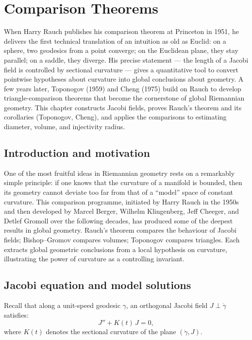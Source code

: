 \chapter{Comparison Theorems}
\label{ch:comparison}

When Harry Rauch publishes his comparison theorem at Princeton in 1951, he delivers the first technical translation of an intuition as old as Euclid: on a sphere, two geodesics from a point converge; on the Euclidean plane, they stay parallel; on a saddle, they diverge. His precise statement --- the length of a Jacobi field is controlled by sectional curvature --- gives a quantitative tool to convert pointwise hypotheses about curvature into global conclusions about geometry. A few years later, Toponogov (1959) and Cheng (1975) build on Rauch to develop triangle-comparison theorems that become the cornerstone of global Riemannian geometry. This chapter constructs Jacobi fields, proves Rauch's theorem and its corollaries (Toponogov, Cheng), and applies the comparisons to estimating diameter, volume, and injectivity radius.

\section{Introduction and motivation}

One of the most fruitful ideas in Riemannian geometry rests on a remarkably simple principle: if one knows that the curvature of a manifold is bounded, then its geometry cannot deviate too far from that of a ``model'' space of constant curvature. This comparison programme, initiated by Harry Rauch in the 1950s and then developed by Marcel Berger, Wilhelm Klingenberg, Jeff Cheeger, and Detlef Gromoll over the following decades, has produced some of the deepest results in global geometry. Rauch's theorem compares the behaviour of Jacobi fields; Bishop--Gromov compares volumes; Toponogov compares triangles. Each extracts global geometric conclusions from a local hypothesis on curvature, illustrating the power of curvature as a controlling invariant.

\section{Jacobi equation and model solutions}

Recall that along a unit-speed geodesic $\gamma$, an orthogonal Jacobi field
$J \perp \dot\gamma$ satisfies:
\[
    J'' + K(t)\, J = 0,
\]
where $K(t)$ denotes the sectional curvature of the plane $(\dot\gamma, J)$.

